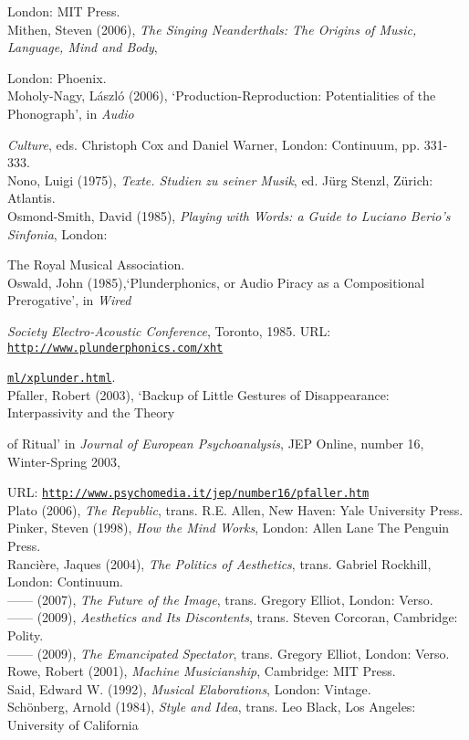 London: MIT Press. 
\hypertarget{mithen}{}\\
Mithen, Steven (2006), \emph{The Singing Neanderthals: The Origins of Music, Language, Mind and Body}, 

London: Phoenix. 
\hypertarget{moholy}{}\\
Moholy-Nagy, L\'{a}szl\'{o} (2006),  `Production-Reproduction: Potentialities of the Phonograph', in \emph{Audio} 

\emph{Culture}, eds. Christoph Cox and Daniel Warner, London: Continuum, pp. 331-333.
\hypertarget{nono}{}\\
Nono, Luigi (1975), \emph{Texte. Studien zu seiner Musik}, ed. J\"{u}rg Stenzl, Z\"{u}rich: Atlantis. 
\hypertarget{ossmith}{}\\
Osmond-Smith, David (1985), \emph{Playing with Words: a Guide to Luciano Berio's Sinfonia},  London: 

The Royal Musical Association. 
\hypertarget{oswald}{}\\
Oswald, John (1985),`Plunderphonics, or Audio Piracy as a Compositional Prerogative', in \emph{Wired}

\emph{Society Electro-Acoustic Conference}, Toronto, 1985. URL: \href{http://www.plunderphonics.com/xhtml/xplunder.html}{\texttt{http://www.plunderphonics.com/xht}}

\href{http://www.plunderphonics.com/xhtml/xplunder.html}{\texttt{ml/xplunder.html}}.
\hypertarget{pfaller}{}\\
Pfaller, Robert (2003), `Backup of Little Gestures of Disappearance: Interpassivity and the Theory 

of Ritual' in \emph{Journal of European Psychoanalysis}, JEP Online, number 16, Winter-Spring 2003, 

URL: \href{http://www.psychomedia.it/jep/number16/pfaller.htm}{\texttt {http://www.psychomedia.it/jep/number16/pfaller.htm}} 
\hypertarget{plato}{}\\
Plato (2006), \emph{The Republic}, trans. R.E. Allen, New Haven: Yale University Press. 
\hypertarget{pinker}{}\\
Pinker, Steven (1998), \emph{How the Mind Works}, London: Allen Lane The Penguin Press. 
\hypertarget{ranpoli}{}\\
Ranci\`{e}re, Jaques (2004), \emph{The Politics of Aesthetics}, trans. Gabriel Rockhill, London: Continuum. 
\hypertarget{ranimg}{}\\
------ (2007), \emph{The Future of the Image}, trans. Gregory Elliot, London: Verso. 
\hypertarget{ranaesth}{}\\
------ (2009), \emph{Aesthetics and Its Discontents}, trans. Steven Corcoran, Cambridge: Polity. 
\hypertarget{ranspec}{}\\
------ (2009), \emph{The Emancipated Spectator}, trans. Gregory Elliot, London: Verso.
\hypertarget{rowe}{}\\
Rowe, Robert (2001), \emph{Machine Musicianship}, Cambridge: MIT Press. 
\hypertarget{said}{}\\
Said, Edward W. (1992), \emph{Musical Elaborations}, London: Vintage. 
\hypertarget{schoen}{}\\
Sch\"{o}nberg, Arnold (1984),  \emph{Style and Idea}, trans. Leo Black, Los Angeles: University of California

